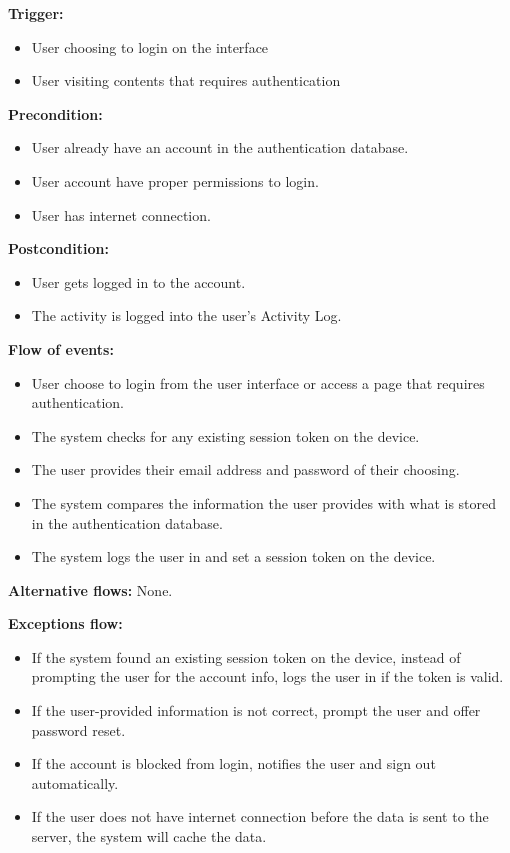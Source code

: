 \documentclass[a4paper]{article}
\begin{document}
        \textbf{Trigger:}
        \begin{itemize}
            \item User choosing to login on the interface
            \item User visiting contents that requires authentication
        \end{itemize}

        \textbf{Precondition:}
        \begin{itemize}
            \item User already have an account in the authentication database.
            \item User account have proper permissions to login.
            \item User has internet connection.
        \end{itemize}

        \textbf{Postcondition:}
        \begin{itemize}
            \item User gets logged in to the account.
            \item The activity is logged into the user's Activity Log.
        \end{itemize}

        \textbf{Flow of events:}
        \begin{itemize}
            \item User choose to login from the user interface or access a page that requires authentication.
            \item The system checks for any existing session token on the device.
            \item The user provides their email address and password of their choosing.
            \item The system compares the information the user provides with what is stored in the authentication database.
            \item The system logs the user in and set a session token on the device.
        \end{itemize}
        
        \textbf{Alternative flows:}
        None.

        \textbf{Exceptions flow:}
        \begin{itemize}
            \item If the system found an existing session token on the device, instead of prompting the user for the account info, logs the user in if the token is valid.
            \item If the user-provided information is not correct, prompt the user and offer password reset.
            \item If the account is blocked from login, notifies the user and sign out automatically.
            \item If the user does not have internet connection before the data is sent to the server, the system will cache the data.
        \end{itemize}
\end{document}
